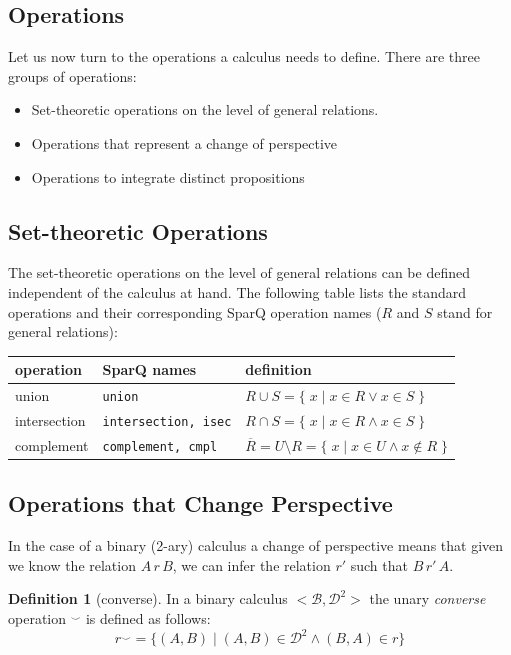 \documentclass[headsepline]{scrreprt}
\theoremstyle{definition}
\newtheorem{defn}{Definition}
\newcommand{\engine}{SparQ}
\begin{document}
\subsection{Operations}\label{sec:operations}

Let us now turn to the operations a calculus needs to define.
There are three groups of operations:
\begin{itemize}
	\item Set-theoretic operations on the level of general relations.
	\item Operations that represent a change of perspective
	\item Operations to integrate distinct propositions
\end{itemize}

\subsection{Set-theoretic Operations}
The set-theoretic operations on the level of general relations
can be defined independent of the calculus at hand. The following table lists the standard operations and
their corresponding \engine{} operation names ($R$ and $S$ stand for general relations):

\begin{tabular}{|l|l|l|}\hline
{\bf operation} & {\bf \engine{} names} & {\bf definition} \\ \hline \hline
union & {\tt union} & $R \cup S = \{\; x\; |\; x \in R \vee x \in S\;\}$\\
intersection & {\tt intersection, isec} & $R \cap S = \{\; x\; |\; x \in R \wedge x \in S\;\}$\\
complement & {\tt complement, cmpl}&  $\overline{R} = U \setminus R = \{\; x\; |\; x \in U \wedge x \not\in R\; \}$\\ \hline
\end{tabular}


\subsection{Operations that Change Perspective}
In the case of a binary (2-ary) calculus a change of perspective means that given we know the relation $A\, r \, B$, we can infer the relation $r'$ such that $B\, r'\, A$.

\begin{defn}[converse]
	In a binary calculus $<\mathcal{B},\mathcal{D}^2>$ the unary {\em converse} operation $^{\smile}$ is defined as follows:
	$$ r^{\smile} = \{ (A,B)\; |\; (A,B) \in \mathcal{D}^2 \wedge (B,A) \in r \}$$
\end{defn}
\end{document}
